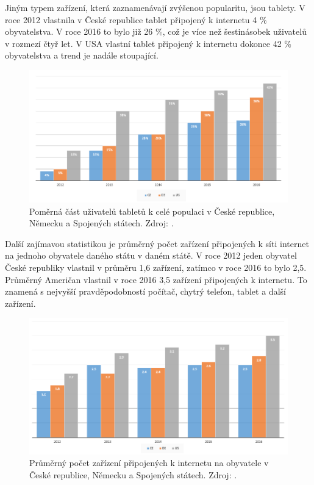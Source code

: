 Jiným typem zařízení, která zaznamenávají zvýšenou popularitu, jsou tablety. V roce 2012 vlastnila v České republice tablet připojený k internetu 4 \% obyvatelstva. V roce 2016 to bylo již 26 \%, což je více než šestinásobek uživatelů v rozmezí čtyř let. V USA vlastní tablet připojený k internetu dokonce 42 \% obyvatelstva a trend je nadále stoupající. 

\begin{figure}[h!]\label{uzivateleTablet}
\centering
\includegraphics[width=13cm]{img/uzivateleTablet}
\caption{Poměrná část uživatelů tabletů k celé populaci v České republice, Německu a Spojených státech. Zdroj: \cite{barometer}.} 
\end{figure}

Další zajímavou statistikou je průměrný počet zařízení připojených k síti internet na jednoho obyvatele daného státu v daném státě. V roce 2012 jeden obyvatel České republiky vlastnil v průměru 1,6 zařízení, zatímco v roce 2016 to bylo 2,5. Průměrný Američan vlastnil v roce 2016 3,5 zařízení připojených k internetu. To znamená s nejvyšší pravděpodobností počítač, chytrý telefon, tablet a další zařízení.

\begin{figure}[h!]\label{pocetZarizeni}
\centering
\includegraphics[width=13cm]{img/pocetZarizeni}
\caption{Průměrný počet zařízení připojených k internetu na obyvatele v České republice, Německu a Spojených státech. Zdroj: \cite{barometer}.} 
\end{figure}

